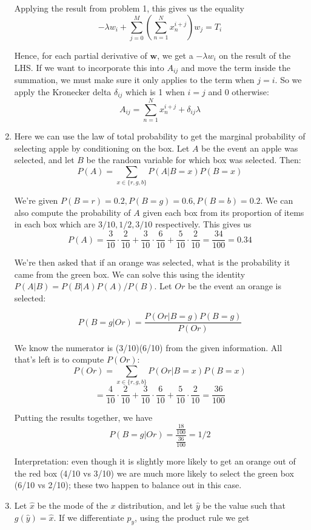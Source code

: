 \documentclass[../main.tex]{subfiles}
\begin{document}
\begin{enumerate}
Applying the result from problem 1, this gives us the equality
$$-\lambda w_i + \sum_{j=0}^M \left(\sum_{n=1}^N x_n^{i+j}\right) w_j = T_i$$

Hence, for each partial derivative of $\mathbf{w}$, we get a $-\lambda w_i$ on the result of the LHS. If we want to incorporate this into $A_{ij}$ and move the term inside the summation, we must make sure it only applies to the term when $j = i$. So we apply the Kronecker delta $\delta_{ij}$ which is 1 when $i=j$ and $0$ otherwise:
$$A_{ij} = \sum_{n=1}^N x_n^{i+j} + \delta_{ij}\lambda $$

\item Here we can use the law of total probability to get the marginal probability of selecting apple by conditioning on the box. Let $A$ be the event an apple was selected, and let $B$ be the random variable for which box was selected. Then:
$$P(A) = \sum_{x \in \{r, g, b\}} P(A | B=x)P(B=x)$$

We're given $P(B = r) = 0.2, P(B = g) = 0.6, P(B = b) = 0.2$. We can also compute the probability of $A$ given each box from its proportion of items in each box which are $3/10, 1/2, 3/10$ respectively. This gives us
$$P(A) = \frac{3}{10}\cdot \frac{2}{10}+\frac{3}{10}\cdot\frac{6}{10}+ \frac{5}{10}\cdot\frac{2}{10} = \frac{34}{100} = 0.34$$

We're then asked that if an orange was selected, what is the probability it came from the green box. We can solve this using the identity $P(A | B) = P(B|A)P(A)/P(B)$. Let $Or$ be the event an orange is selected:

$$P(B = g | Or) = \frac{P(Or | B = g)P(B = g)}{P(Or)}$$

We know the numerator is (3/10)(6/10) from the given information. All that's left is to compute $P(Or)$:
$$P(Or) = \sum_{x \in \{r, g, b\}} P(Or | B = x)P(B = x)$$
$$ = \frac{4}{10}\cdot\frac{2}{10} + \frac{3}{10}\cdot\frac{6}{10} + \frac{5}{10}\cdot\frac{2}{10} = \frac{36}{100}$$

Putting the results together, we have 
$$P(B = g | Or) = \frac{\frac{18}{100}}{\frac{36}{100}} = 1/2$$

Interpretation: even though it is slightly more likely to get an orange out of the red box (4/10 vs 3/10) we are much more likely to select the green box (6/10 vs 2/10); these two happen to balance out in this case.

\item Let $\hat{x}$ be the mode of the $x$ distribution, and let $\hat{y}$ be the value such that $g(\hat{y}) = \hat{x}$.  If we differentiate $p_y$, using the product rule we get


\end{enumerate}
\end{document}
